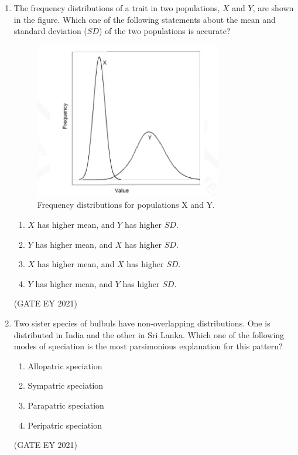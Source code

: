 \documentclass[journal]{IEEEtran}
\begin{document}
\begin{enumerate}
    \item The frequency distributions of a trait in two populations, $X$ and $Y$, are shown in the figure. Which one of the following statements about the mean and standard deviation ($SD$) of the two populations is accurate?
    \begin{figure}[!h]
        \centering
        \includegraphics[width=0.3\columnwidth]{figs/Q.8.png}
        \caption{Frequency distributions for populations X and Y.}
        \label{Q.8}
    \end{figure}
    \begin{enumerate}
        \item $X$ has higher mean, and $Y$ has higher $SD$.
        \item $Y$ has higher mean, and $X$ has higher $SD$.
        \item $X$ has higher mean, and $X$ has higher $SD$.
        \item $Y$ has higher mean, and $Y$ has higher $SD$.
    \end{enumerate}
    \hfill{(GATE EY 2021)}

    \item Two sister species of bulbuls have non-overlapping distributions. One is distributed in India and the other in Sri Lanka. Which one of the following modes of speciation is the most parsimonious explanation for this pattern?
    \begin{multicols}{2}
    \begin{enumerate}
        \item Allopatric speciation
        \item Sympatric speciation
        \item Parapatric speciation
        \item Peripatric speciation
    \end{enumerate}
    \end{multicols}
    \hfill{(GATE EY 2021)}


\end{enumerate}
\end{document}

